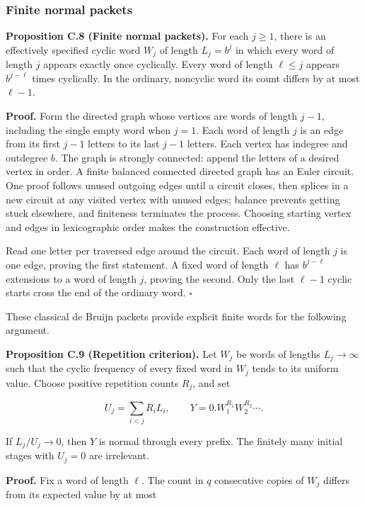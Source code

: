 \documentclass[11pt,a4paper]{article}
\begin{document}
\subsubsection{Finite normal packets}\label{finite-normal-packets}

\textbf{Proposition C.8 (Finite normal packets).} For each \(j\ge1\),
there is an effectively specified cyclic word \(W_j\) of length
\(L_j=b^j\) in which every word of length \(j\) appears exactly once
cyclically. Every word of length \(\ell\le j\) appears \(b^{j-\ell}\)
times cyclically. In the ordinary, noncyclic word its count differs by
at most \(\ell-1\).

\textbf{Proof.} Form the directed graph whose vertices are words of
length \(j-1\), including the single empty word when \(j=1\). Each word
of length \(j\) is an edge from its first \(j-1\) letters to its last
\(j-1\) letters. Each vertex has indegree and outdegree \(b\). The graph
is strongly connected: append the letters of a desired vertex in order.
A finite balanced connected directed graph has an Euler circuit. One
proof follows unused outgoing edges until a circuit closes, then splices
in a new circuit at any visited vertex with unused edges; balance
prevents getting stuck elsewhere, and finiteness terminates the process.
Choosing starting vertex and edges in lexicographic order makes the
construction effective.

Read one letter per traversed edge around the circuit. Each word of
length \(j\) is one edge, proving the first statement. A fixed word of
length \(\ell\) has \(b^{j-\ell}\) extensions to a word of length \(j\),
proving the second. Only the last \(\ell-1\) cyclic starts cross the end
of the ordinary word. \(\square\)

These classical de Bruijn packets provide explicit finite words for the
following argument.

\textbf{Proposition C.9 (Repetition criterion).} Let \(W_j\) be words of
lengths \(L_j\to\infty\) such that the cyclic frequency of every fixed
word in \(W_j\) tends to its uniform value. Choose positive repetition
counts \(R_j\), and set

\[
U_j=\sum_{i< j}R_iL_i,
\qquad Y=0.W_1^{R_1}W_2^{R_2}\cdots.
\]

If \(L_j/U_j\to0\), then \(Y\) is normal through every prefix. The
finitely many initial stages with \(U_j=0\) are irrelevant.

\textbf{Proof.} Fix a word of length \(\ell\). The count in \(q\)
consecutive copies of \(W_j\) differs from its expected value by at most
\end{document}
